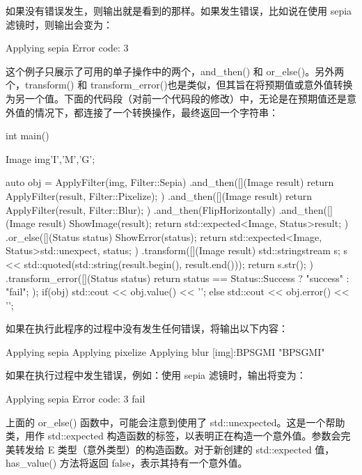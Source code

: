 如果没有错误发生，则输出就是看到的那样。如果发生错误，比如说在使用 sepia 滤镜时，则输出会变为：

\begin{shell}
Applying sepia
Error code: 3
\end{shell}

这个例子只展示了可用的单子操作中的两个，and\_then() 和 or\_else()。另外两个，transform() 和 transform\_error()也是类似，但其旨在将预期值或意外值转换为另一个值。下面的代码段（对前一个代码段的修改）中，无论是在预期值还是意外值的情况下，都连接了一个转换操作，最终返回一个字符串：

\begin{cpp}
int main()
{
    Image img{'I','M','G'};

    auto obj = ApplyFilter(img, Filter::Sepia)
    .and_then([](Image result){
        return ApplyFilter(result, Filter::Pixelize);
    })
    .and_then([](Image result){
        return ApplyFilter(result, Filter::Blur);
    })
    .and_then(FlipHorizontally)
    .and_then([](Image result){
        ShowImage(result);
        return std::expected<Image, Status>{result};
    })
    .or_else([](Status status){
        ShowError(status);
        return std::expected<Image, Status>{std::unexpect, status};
    })
    .transform([](Image result){
        std::stringstream s;
        s << std::quoted(std::string(result.begin(),
        result.end()));
        return s.str();
    })
    .transform_error([](Status status){
        return status == Status::Success ? "success" : "fail";
    });
    if(obj)
        std::cout << obj.value() << '\n';
    else
        std::cout << obj.error() << '\n';
}
\end{cpp}

如果在执行此程序的过程中没有发生任何错误，将输出以下内容：

\begin{shell}
Applying sepia
Applying pixelize
Applying blur
[img]:BPSGMI
"BPSGMI"
\end{shell}

如果在执行过程中发生错误，例如：使用 sepia 滤镜时，输出将变为：

\begin{shell}
Applying sepia
Error code: 3
fail
\end{shell}

上面的 or\_else() 函数中，可能会注意到使用了 std::unexpected。这是一个帮助类，用作 std::expected 构造函数的标签，以表明正在构造一个意外值。参数会完美转发给 E 类型（意外类型）的构造函数。对于新创建的 std::expected 值，has\_value() 方法将返回 false，表示其持有一个意外值。

